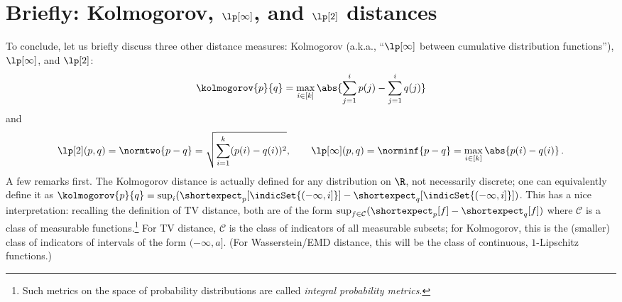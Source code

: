 \documentclass[10pt]{article}
\newcommand{\ab}{k}
\begin{document}
\section{Briefly: Kolmogorov, $\lp[\infty]$, and $\lp[2]$ distances}
To conclude, let us briefly discuss three other distance measures: Kolmogorov (a.k.a., ``$\lp[\infty]$ between cumulative distribution functions''), $\lp[\infty]$, and $\lp[2]$:
\[
    \kolmogorov{p}{q} = \max_{i\in[\ab]} \abs{\sum_{j=1}^i p(j) - \sum_{j=1}^i q(j)} 
\] and
\[
    \lp[2](p,q) = \normtwo{p-q} = \sqrt{\sum_{i=1}^\ab (p(i)-q(i))^2},\qquad
    \lp[\infty](p,q) = \norminf{p-q} = \max_{i\in[\ab]} \abs{p(i)-q(i)}\,.
\]
A few remarks first. The Kolmogorov distance is actually defined for any distribution on $\R$, not necessarily discrete; one can equivalently define it as
$
\kolmogorov{p}{q} =\sup_{i} ( \shortexpect_p[\indicSet{(-\infty,i]}] - \shortexpect_q[\indicSet{(-\infty,i]}] )$. This has a nice interpretation: recalling the definition of TV distance, both are of the form $\sup_{f \in\mathcal{C}} (\shortexpect_p[f] - \shortexpect_q[f])
$ where $\mathcal{C}$ is a class of measurable functions.\footnote{Such metrics on the space of probability distributions are called \emph{integral probability metrics}.}{} For TV distance, $\mathcal{C}$ is the class of indicators of all measurable subsets; for Kolmogorov, this is the (smaller) class of indicators of intervals of the form $(-\infty, a]$. (For Wasserstein/EMD distance, this will be the class of continuous, $1$-Lipschitz functions.)
\end{document}
